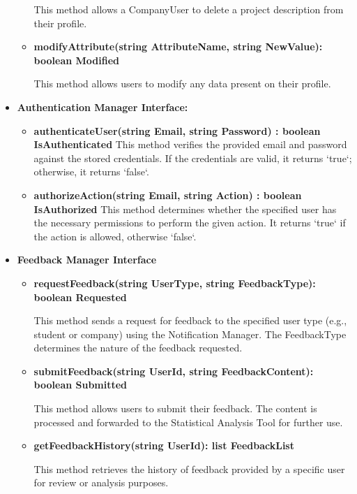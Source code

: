 \begin{itemize}
\begin{itemize}
    This method allows a CompanyUser to delete a project description from their profile.

    \item \textbf{modifyAttribute(string AttributeName, string NewValue): boolean Modified}
    
    This method allows users to modify any data present on their profile.
    \end{itemize}

\item \textbf{Authentication Manager Interface:}
\begin{itemize}
\item \textbf{authenticateUser(string Email, string Password) : boolean IsAuthenticated}  
This method verifies the provided email and password against the stored credentials. If the credentials are valid, it returns `true`; otherwise, it returns `false`.

\item \textbf{authorizeAction(string Email, string Action) : boolean IsAuthorized}  
This method determines whether the specified user has the necessary permissions to perform the given action. It returns `true` if the action is allowed, otherwise `false`.


\end{itemize}

\item \textbf{Feedback Manager Interface}
    \begin{itemize}
    \item \textbf{requestFeedback(string UserType, string FeedbackType): boolean Requested}

    This method sends a request for feedback to the specified user type (e.g., student or company) using the Notification Manager. The FeedbackType determines the nature of the feedback requested.

    \item \textbf{submitFeedback(string UserId, string FeedbackContent): boolean Submitted}

    This method allows users to submit their feedback. The content is processed and forwarded to the Statistical Analysis Tool for further use.

    \item \textbf{getFeedbackHistory(string UserId): list FeedbackList}

    This method retrieves the history of feedback provided by a specific user for review or analysis purposes.


\end{itemize}
\end{itemize}
